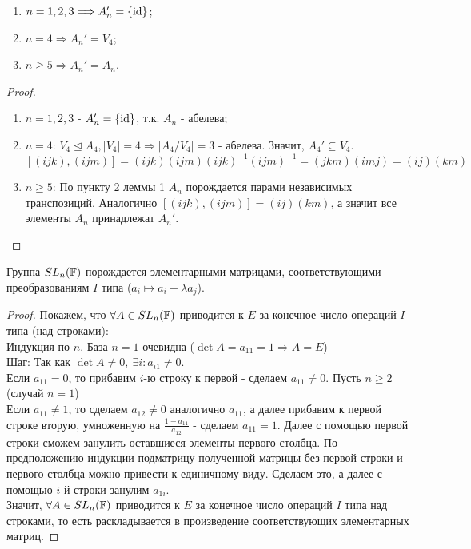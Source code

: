 \begin{subtheorem}\tab
    \begin{enumerate}
        \item $n = 1, 2, 3 \Longrightarrow A_n' = \{\textup{id}\}$;
        \item $n = 4 \Longrightarrow A_n' = V_4$;
        \item $n \geqslant 5 \Longrightarrow A_n' = A_n$.
    \end{enumerate}
\end{subtheorem}
\begin{proof}\tab
    \begin{enumerate}
        \item $n = 1, 2, 3$ - $A_n' = \{\textup{id}\}$, т.к. $A_n$ - абелева;
        \item $n = 4$:
        $V_4 \unlhd A_4, |V_4| = 4 \Longrightarrow |A_4/V_4| = 3$ - абелева. Значит, $A_4' \subseteq V_4$.
        \[[(ijk), (ijm)] = (ijk)(ijm)(ijk)^{-1}(ijm)^{-1} = (jkm)(imj) = (ij)(km)\]
        \item $n \geqslant 5$: По пункту 2 леммы 1 $A_n$ порождается парами независимых транспозиций. Аналогично $[(ijk), (ijm)] = (ij)(km)$, а значит все элементы $A_n$ принадлежат $A_n'$.
    \end{enumerate}    
\end{proof}
\begin{lemmanum}
    Группа $SL_n(\mathbb{F})$ порождается элементарными матрицами, соответствующими преобразованиям $I$ типа ($a_i \mapsto a_i + \lambda a_j$).
\end{lemmanum}
\begin{proof}
    Покажем, что $\forall A \in SL_n(\mathbb{F})$ приводится к $E$ за конечное число операций $I$ типа (над строками):\\
    Индукция по $n$. База $n=1$ очевидна ($\det A = a_{11} = 1 \Longrightarrow A = E$)\\
    Шаг: Так как $\det A \neq 0, \ \exists i: a_{i1} \neq 0$.\\
    Если $a_{11} = 0$, то прибавим $i$-ю строку к первой - сделаем $a_{11} \neq 0$. Пусть $n \geqslant 2$ (случай $n=1$)\\
    Если $a_{11} \neq 1$, то сделаем $a_{12} \neq 0$ аналогично $a_{11}$, а далее прибавим к первой строке вторую, умноженную на $\frac{1-a_{11}}{a_{12}}$ - сделаем $a_{11} = 1$.
    Далее с помощью первой строки сможем занулить оставшиеся элементы первого столбца. По предположению индукции подматрицу полученной матрицы без первой строки и первого столбца можно привести к единичному виду. Сделаем это, а далее с помощью $i$-й строки занулим $a_{1i}$.\\
    Значит, $\forall A \in SL_n(\mathbb{F})$ приводится к $E$ за конечное число операций $I$ типа над строками, то есть раскладывается в произведение соответствующих элементарных матриц.
\end{proof}
